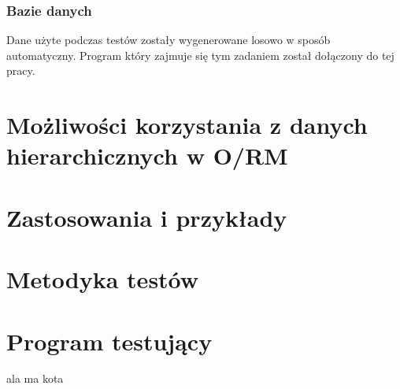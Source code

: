 \documentclass[12pt,a4paper,intlimits,oneside]{report}
\begin{document}
\subsection{Bazie danych}



Dane użyte podczas testów zostały wygenerowane losowo w sposób automatyczny. Program który zajmuje się tym zadaniem został dołączony do tej pracy.

\chapter{Możliwości korzystania z danych hierarchicznych w O/RM}

\chapter{Zastosowania i przykłady}


\appendix

\chapter{Metodyka testów}



\chapter{Program testujący}





ala ma kota




\clearpage
{}
{}
\printindex
\end{document}

